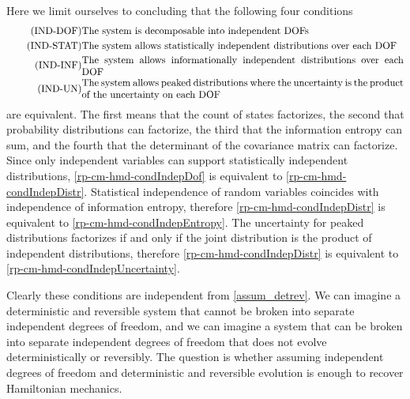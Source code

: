 Here we limit ourselves to concluding that the following four conditions
\begin{align}
	\tag{IND-DOF}\label{rp-cm-hmd-condIndepDof}
	&\eqtext{The system is decomposable into independent DOFs} \\
	\tag{IND-STAT}\label{rp-cm-hmd-condIndepDistr}
	&\eqtext{The system allows statistically independent distributions over each DOF} \\
	\tag{IND-INF}\label{rp-cm-hmd-condIndepEntropy}
	&\eqtext{The system allows informationally independent distributions over each DOF} \\
	\tag{IND-UN}\label{rp-cm-hmd-condIndepUncertainty}
	&\eqtext{The system allows peaked distributions where the uncertainty is the product of the uncertainty on each DOF}
\end{align}
are equivalent. The first means that the count of states factorizes, the second that probability distributions can factorize, the third that the information entropy can sum, and the fourth that the determinant of the covariance matrix can factorize. Since only independent variables can support statistically independent distributions, \ref{rp-cm-hmd-condIndepDof} is equivalent to \ref{rp-cm-hmd-condIndepDistr}. Statistical independence of random variables coincides with independence of information entropy, therefore \ref{rp-cm-hmd-condIndepDistr} is equivalent to \ref{rp-cm-hmd-condIndepEntropy}. The uncertainty for peaked distributions factorizes if and only if the joint distribution is the product of independent distributions, therefore  \ref{rp-cm-hmd-condIndepDistr} is equivalent to \ref{rp-cm-hmd-condIndepUncertainty}.

Clearly these conditions are independent from \ref{assum_detrev}. We can imagine a deterministic and reversible system that cannot be broken into separate independent degrees of freedom, and we can imagine a system that can be broken into separate independent degrees of freedom that does not evolve deterministically or reversibly. The question is whether assuming independent degrees of freedom and deterministic and reversible evolution is enough to recover Hamiltonian mechanics. 

